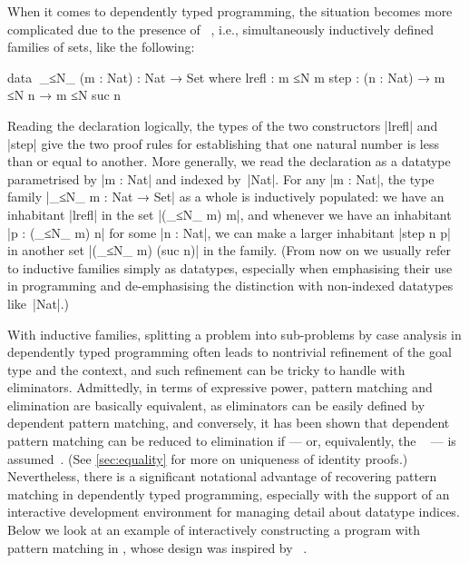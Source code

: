 When it comes to dependently typed programming, the situation becomes more complicated due to the presence of ~\citep{Dybjer-inductive-families}, i.e., simultaneously inductively defined families of sets, like the following:
\begin{code}
data ^^^_≤N_ (m : Nat) : Nat → Set where
  lrefl  : m ≤N m
  step   : (n : Nat) → m ≤N n → m ≤N suc n
\end{code}
Reading the declaration logically, the types of the two constructors |lrefl| and |step| give the two proof rules for establishing that one natural number is less than or equal to another.
More generally, we read the declaration as a datatype parametrised by |m : Nat|  and indexed by~|Nat|.
For any |m : Nat|, the type family |_≤N_ m : Nat → Set| as a whole is inductively populated: we have an inhabitant |lrefl| in the set |(_≤N_ m) m|, and whenever we have an inhabitant |p : (_≤N_ m) n| for some |n : Nat|, we can make a larger inhabitant |step n p| in another set |(_≤N_ m) (suc n)| in the family.
(From now on we usually refer to inductive families simply as datatypes, especially when emphasising their use in programming and de-emphasising the distinction with non-indexed datatypes like~|Nat|.)

With inductive families, splitting a problem into sub-problems by case analysis in dependently typed programming often leads to nontrivial refinement of the goal type and the context, and such refinement can be tricky to handle with eliminators.
Admittedly, in terms of expressive power, pattern matching and elimination are basically equivalent, as eliminators can be easily defined by dependent pattern matching, and conversely, it has been shown that dependent pattern matching can be reduced to elimination if  --- or, equivalently, the ~\citep{Streicher-ITT} --- is assumed~\citep{McBride-thesis, Goguen-elim}.
(See \autoref{sec:equality} for more on uniqueness of identity proofs.)
Nevertheless, there is a significant notational advantage of recovering pattern matching in dependently typed programming, especially with the support of an interactive development environment for managing detail about datatype indices.
Below we look at an example of interactively constructing a program with pattern matching in \Agda, whose design was inspired by ~\citep{McBride-Epigram, McBride-view}.


